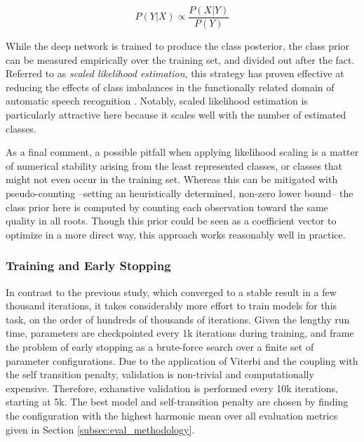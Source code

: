 \begin{equation}
P(Y|X) \varpropto \frac{P(X|Y)}{P(Y)}
\end{equation}

While the deep network is trained to produce the class posterior, the class prior can be measured empirically over the training set, and divided out after the fact.
Referred to as \emph{scaled likelihood estimation}, this strategy has proven effective at reducing the effects of class imbalances in the functionally related domain of automatic speech recognition \cite{Deng, others}.
Notably, scaled likelihood estimation is particularly attractive here because it scales well with the number of estimated classes.

As a final comment, a possible pitfall when applying likelihood scaling is a matter of numerical stability arising from the least represented classes, or classes that might not even occur in the training set.
Whereas this can be mitigated with pseudo-counting \cite{?} --setting an heuristically determined, non-zero lower bound-- the class prior here is computed by counting each observation toward the same quality in all roots.
Though this prior could be seen as a coefficient vector to optimize in a more direct way, this approach works reasonably well in practice.


\subsubsection{Training and Early Stopping}
\label{subsubsec:early_stopping}

In contrast to the previous study, which converged to a stable result in a few thousand iterations, it takes considerably more effort to train models for this task, on the order of hundreds of thousands of iterations.
Given the lengthy run time, parameters are checkpointed every 1k iterations during training, and frame the problem of early stopping as a brute-force search over a finite set of parameter configurations.
Due to the application of Viterbi and the coupling with the self transition penalty, validation is non-trivial and computationally expensive.
Therefore, exhaustive validation is performed every 10k iterations, starting at 5k.
The best model and self-transition penalty are chosen by finding the configuration with the highest harmonic mean over all evaluation metrics given in Section \ref{subsec:eval_methodology}.



